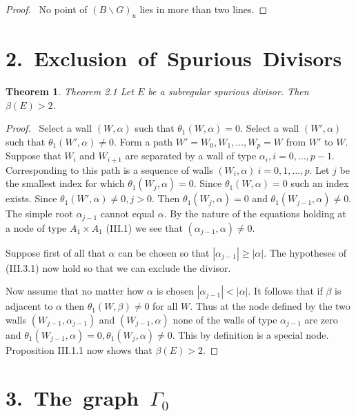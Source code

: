 \documentclass{memo-l}
\newtheorem{theorem}{Theorem}[section]
\theoremstyle{definition}
\theoremstyle{remark}
\numberwithin{section}{chapter}
\numberwithin{equation}{chapter}
\begin{document}
\medskip

\begin{proof} \  No point of $(B\backslash G)_{u}$ lies in more than
two lines.
\end{proof} 


\section{{2.\  Exclusion\ of\ Spurious\ Divisors}}

\begin{theorem}{Theorem 2.1}    Let $E$ be a subregular spurious divisor. 
 Then ${\beta}(E) > 2$.
\end{theorem}

\medpagebreak

\begin{proof} \ Select a wall $(W,{\alpha})$ such that
${\theta}_{1}(W,{\alpha}) = 0$.  Select a wall $(W',{\alpha})$ such that
${\theta}_{1}(W',{\alpha})\ne 0$.  Form a path $W' = W_{0},W_{1},\ldots ,
W_{p} = W$ from $W'$ to $W$.  Suppose that $W_{i}$ and $W_{i+1}$ are
separated by a wall of type ${\alpha}_{i}, i = 0,\ldots ,p-1$.  Corresponding
to this path is a sequence of walls $(W_{i},{\alpha})\  i = 0,1,\ldots ,p$.
Let $j$ be the smallest index for which ${\theta}_{1}(W_{j},{\alpha}) = 0$.
Since ${\theta}_{1}(W,{\alpha}) = 0$ such an index exists.  Since
${\theta}_{1}(W',{\alpha})\ne 0, j > 0$.  Then
${\theta}_{1}(W_{j},{\alpha}) = 0$ and ${\theta}_{1}(W_{j-1},{\alpha})\ne 0$.
The simple root ${\alpha}_{j-1}$ cannot equal ${\alpha}$.  By the nature of
the equations holding at a node of type $A_{1} \times A_{1}$ (III.1) we see
that $({\alpha}_{j-1},{\alpha})\ne 0$.

   Suppose first of all that ${\alpha}$ can be chosen so that 
   $|\alpha_{j-1}|\ge |\alpha|$.
  The hypotheses
of (III.3.1) now hold so that we can exclude the divisor.

   Now assume that no matter how ${\alpha}$ is chosen $|\alpha_{j-1}|< |\alpha|$.
  It follows that if ${\beta}$
is adjacent to ${\alpha}$ then ${\theta}_{1}(W,{\beta})\ne 0$ for all $W$.
Thus at the node defined by the two walls $(W_{j-1},{\alpha}_{j-1})$ and
$(W_{j-1},{\alpha})$ none of the walls of type ${\alpha}_{j-1}$ are zero
and ${\theta}_{1}(W_{j-1},{\alpha}) = 0, {\theta}_{1}(W_{j},{\alpha})\ne 0$.
This by definition is a special node.  Proposition III.1.1 now shows that
${\beta}(E) > 2$.
\end{proof} 

\section{ 3.\  The\ graph\ $\Gamma_0$}
\end{document}
